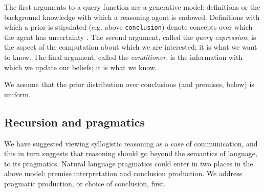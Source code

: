 \documentclass[10pt,letterpaper]{article}
\begin{document}
The first arguments to a query function are a generative model: definitions or the background knowledge with which a reasoning agent is endowed. Definitions with which a prior is stipulated (e.g. above \lstinline{conclusion}) denote concepts over which the agent has uncertainty . The second argument, called the \emph{query expression}, is the aspect of the computation about which we are interested; it is what we want to know. The final argument, called the \emph{conditioner}, is the information with which we update our beliefs; it is what we know. 

We assume that the prior distribution over conclusions (and premises, below) is uniform.

%
%  
%  


\subsection{Recursion and pragmatics}
We have suggested viewing syllogistic reasoning as a case of communication, and this in turn suggests that reasoning should go beyond the semantics of language, to its pragmatics.
Natural language pragmatics could enter in two places in the above model: premise interpretation and conclusion production. 
We address pragmatic production, or choice of conclusion, first.
\end{document}
